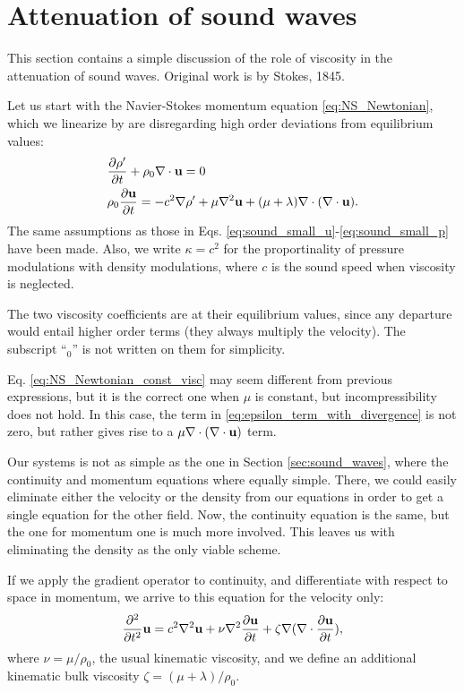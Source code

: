 \section{Attenuation of sound waves}
\label{sec:sound_waves_att}

This section contains a simple discussion of the role of viscosity in
the attenuation of sound waves. Original work is by Stokes, 1845.

Let us start with the Navier-Stokes momentum equation
\ref{eq:NS_Newtonian},
which we linearize by are disregarding high
order deviations from equilibrium values:
\begin{align}
  & \frac{\partial\rho' }{\partial t}  + \rho_0 \nabla\cdot\mathbf{u} =0 \\
  & \label{eq:NS_Newtonian_const_visc}
    \rho_0 \frac{\partial \mathbf{u} }{\partial t} =
    - c^2 \nabla \rho' + \mu \nabla^2 \mathbf{u}
    + ( \mu + \lambda ) \nabla\cdot ( \nabla\cdot\mathbf{u} ) .
\end{align}
The same assumptions as those in
Eqs. \ref{eq:sound_small_u}-\ref{eq:sound_small_p} have been made.
Also, we write $\kappa = c^2$ for the proportinality of pressure
modulations with density modulations, where $c$ is the sound speed
when viscosity is neglected.

The two viscosity coefficients are at their equilibrium values, since
any departure would entail higher order terms (they always multiply
the velocity). The subscript ``$_0$'' is not written on them for
simplicity.

Eq. \ref{eq:NS_Newtonian_const_visc} may seem different from previous
expressions, but it is the correct one when $\mu$ is constant, but
incompressibility does not hold. In this case, the term in
\ref{eq:epsilon_term_with_divergence} is not zero, but rather gives
rise to a $\mu \nabla\cdot ( \nabla\cdot\mathbf{u} )$ term.

Our systems is not as simple as the one in Section
\ref{sec:sound_waves}, where the continuity and momentum equations
where equally simple. There, we could easily eliminate either the
velocity or the density from our equations in order to get a single
equation for the other field. Now, the continuity equation is the
same, but the one for momentum one is much more involved. This leaves
us with eliminating the density as the only viable scheme.

If we apply the gradient operator to continuity, and differentiate
with respect to space in momentum, we arrive to this equation for
the velocity only:
\[
  \frac{\partial^2 }{\partial t^2 } \mathbf{u} =
  c^2\nabla^2 \mathbf{u} + \nu \nabla^2\frac{\partial\mathbf{u}}{\partial t} +
  \zeta \nabla (\nabla\cdot \frac{\partial\mathbf{u}}{\partial t} ) ,
\]
where $\nu=\mu/\rho_0$, the usual kinematic viscosity, and we define
an additional kinematic bulk viscosity $\zeta=(\mu+\lambda)/\rho_0$.


